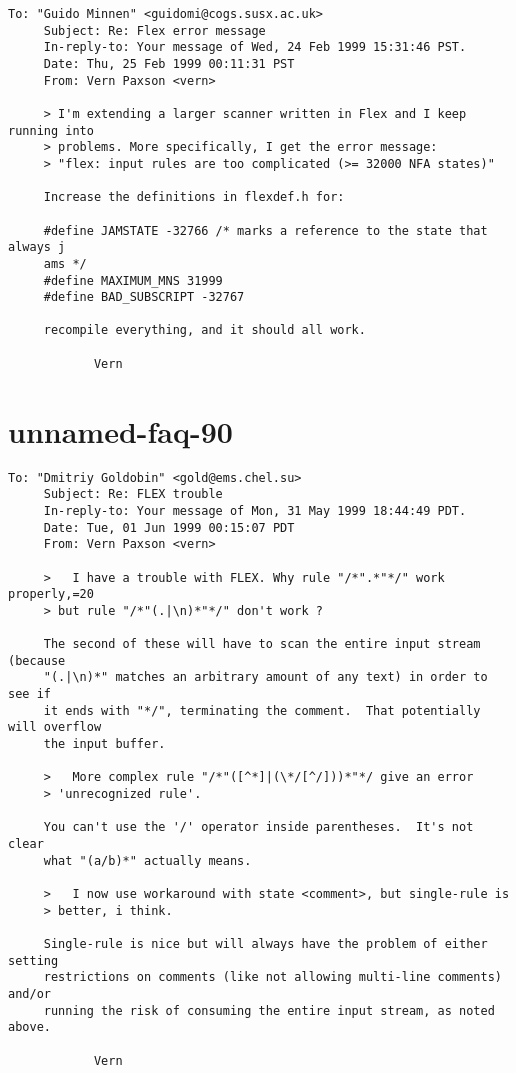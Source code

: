 \documentclass[openany,oneside]{book}
\begin{document}
\begin{verbatim}
To: "Guido Minnen" <guidomi@cogs.susx.ac.uk>
     Subject: Re: Flex error message
     In-reply-to: Your message of Wed, 24 Feb 1999 15:31:46 PST.
     Date: Thu, 25 Feb 1999 00:11:31 PST
     From: Vern Paxson <vern>
     
     > I'm extending a larger scanner written in Flex and I keep running into
     > problems. More specifically, I get the error message:
     > "flex: input rules are too complicated (>= 32000 NFA states)"
     
     Increase the definitions in flexdef.h for:
     
     #define JAMSTATE -32766 /* marks a reference to the state that always j
     ams */
     #define MAXIMUM_MNS 31999
     #define BAD_SUBSCRIPT -32767
     
     recompile everything, and it should all work.
     
     		Vern
\end{verbatim}

\section{unnamed-faq-90}

\begin{verbatim}
To: "Dmitriy Goldobin" <gold@ems.chel.su>
     Subject: Re: FLEX trouble
     In-reply-to: Your message of Mon, 31 May 1999 18:44:49 PDT.
     Date: Tue, 01 Jun 1999 00:15:07 PDT
     From: Vern Paxson <vern>
     
     >   I have a trouble with FLEX. Why rule "/*".*"*/" work properly,=20
     > but rule "/*"(.|\n)*"*/" don't work ?
     
     The second of these will have to scan the entire input stream (because
     "(.|\n)*" matches an arbitrary amount of any text) in order to see if
     it ends with "*/", terminating the comment.  That potentially will overflow
     the input buffer.
     
     >   More complex rule "/*"([^*]|(\*/[^/]))*"*/ give an error
     > 'unrecognized rule'.
     
     You can't use the '/' operator inside parentheses.  It's not clear
     what "(a/b)*" actually means.
     
     >   I now use workaround with state <comment>, but single-rule is
     > better, i think.
     
     Single-rule is nice but will always have the problem of either setting
     restrictions on comments (like not allowing multi-line comments) and/or
     running the risk of consuming the entire input stream, as noted above.
     
     		Vern
\end{verbatim}
\end{document}
